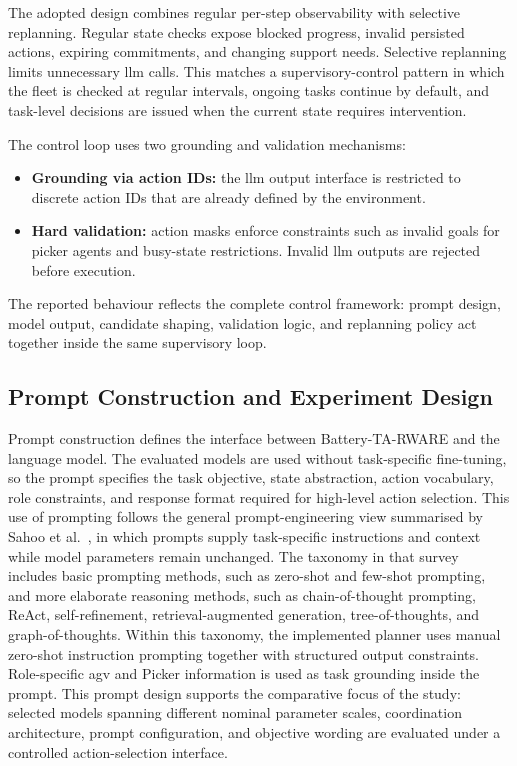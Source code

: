 The adopted design combines regular per-step observability with selective replanning.
Regular state checks expose blocked progress, invalid persisted actions, expiring commitments, and changing support needs.
Selective replanning limits unnecessary \gls{llm} calls.
This matches a supervisory-control pattern in which the fleet is checked at regular intervals, ongoing tasks continue by default, and task-level decisions are issued when the current state requires intervention.

The control loop uses two grounding and validation mechanisms:
\begin{itemize}
    \item \textbf{Grounding via action IDs:} the \gls{llm} output interface is restricted to discrete action IDs that are already defined by the environment.
    \item \textbf{Hard validation:} action masks enforce constraints such as invalid goals for picker agents and busy-state restrictions. Invalid \gls{llm} outputs are rejected before execution.
\end{itemize}

The reported behaviour reflects the complete control framework: prompt design, model output, candidate shaping, validation logic, and replanning policy act together inside the same supervisory loop.

\subsection{Prompt Construction and Experiment Design}
\label{sec:method_prompt_construction}
Prompt construction defines the interface between Battery-TA-RWARE and the language model.
The evaluated models are used without task-specific fine-tuning, so the prompt specifies the task objective, state abstraction, action vocabulary, role constraints, and response format required for high-level action selection.
This use of prompting follows the general prompt-engineering view summarised by Sahoo et al.~\cite{sahoo2024promptsurvey}, in which prompts supply task-specific instructions and context while model parameters remain unchanged.
The taxonomy in that survey includes basic prompting methods, such as zero-shot and few-shot prompting, and more elaborate reasoning methods, such as chain-of-thought prompting, ReAct, self-refinement, retrieval-augmented generation, tree-of-thoughts, and graph-of-thoughts.
Within this taxonomy, the implemented planner uses manual zero-shot instruction prompting together with structured output constraints.
Role-specific \gls{agv} and Picker information is used as task grounding inside the prompt.
This prompt design supports the comparative focus of the study: selected models spanning different nominal parameter scales, coordination architecture, prompt configuration, and objective wording are evaluated under a controlled action-selection interface.

